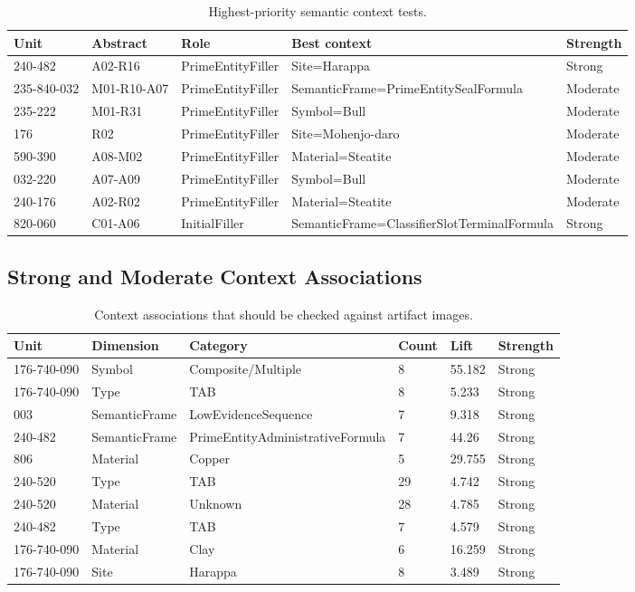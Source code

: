 \begin{table}[htbp]
\centering
\footnotesize
\begin{tabular}{lllll}
\toprule
\textbf{Unit} & \textbf{Abstract} & \textbf{Role} & \textbf{Best context} & \textbf{Strength} \\
\midrule
240-482 & A02-R16 & PrimeEntityFiller & Site=Harappa & Strong \\
235-840-032 & M01-R10-A07 & PrimeEntityFiller & SemanticFrame=PrimeEntitySealFormula & Moderate \\
235-222 & M01-R31 & PrimeEntityFiller & Symbol=Bull & Moderate \\
176 & R02 & PrimeEntityFiller & Site=Mohenjo-daro & Moderate \\
590-390 & A08-M02 & PrimeEntityFiller & Material=Steatite & Moderate \\
032-220 & A07-A09 & PrimeEntityFiller & Symbol=Bull & Moderate \\
240-176 & A02-R02 & PrimeEntityFiller & Material=Steatite & Moderate \\
820-060 & C01-A06 & InitialFiller & SemanticFrame=ClassifierSlotTerminalFormula & Strong \\
\bottomrule
\end{tabular}
\caption{Highest-priority semantic context tests.}
\end{table}

\subsection{Strong and Moderate Context Associations}

\begin{table}[htbp]
\centering
\footnotesize
\begin{tabular}{llllll}
\toprule
\textbf{Unit} & \textbf{Dimension} & \textbf{Category} & \textbf{Count} & \textbf{Lift} & \textbf{Strength} \\
\midrule
176-740-090 & Symbol & Composite/Multiple & 8 & 55.182 & Strong \\
176-740-090 & Type & TAB & 8 & 5.233 & Strong \\
003 & SemanticFrame & LowEvidenceSequence & 7 & 9.318 & Strong \\
240-482 & SemanticFrame & PrimeEntityAdministrativeFormula & 7 & 44.26 & Strong \\
806 & Material & Copper & 5 & 29.755 & Strong \\
240-520 & Type & TAB & 29 & 4.742 & Strong \\
240-520 & Material & Unknown & 28 & 4.785 & Strong \\
240-482 & Type & TAB & 7 & 4.579 & Strong \\
176-740-090 & Material & Clay & 6 & 16.259 & Strong \\
176-740-090 & Site & Harappa & 8 & 3.489 & Strong \\
\bottomrule
\end{tabular}
\caption{Context associations that should be checked against artifact images.}
\end{table}
